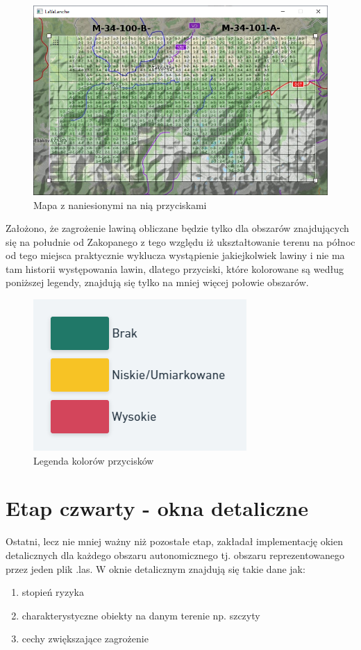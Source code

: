 \begingroup
\begin{figure}[h]
	\centering
	\includegraphics[scale=0.6]{map_window.png}
	\caption{Mapa z naniesionymi na nią przyciskami}
\end{figure}
\endgroup

Założono, że zagrożenie lawiną obliczane będzie tylko dla obszarów znajdujących się na południe od Zakopanego z tego względu iż ukształtowanie terenu na północ od tego miejsca praktycznie wyklucza wystąpienie jakiejkolwiek lawiny i nie ma tam historii występowania lawin, dlatego przyciski, które kolorowane są według poniższej legendy, znajdują się tylko na mniej więcej połowie obszarów. 
\begingroup
\begin{figure}[h]
	\centering
	\includegraphics[scale=0.6]{kolorowanie.png}
	\caption{Legenda kolorów przycisków}
\end{figure}
\endgroup


\clearpage
\section{Etap czwarty - okna detaliczne}
Ostatni, lecz nie mniej ważny niż pozostałe etap, zakładał implementację okien detalicznych dla każdego obszaru autonomicznego tj. obszaru reprezentowanego przez jeden plik .las. W oknie detalicznym znajdują się takie dane jak:
\begin{enumerate}[label=-]
	\item stopień ryzyka
	\item charakterystyczne obiekty na danym terenie np. szczyty
	\item cechy zwiększające zagrożenie
\end{enumerate}

